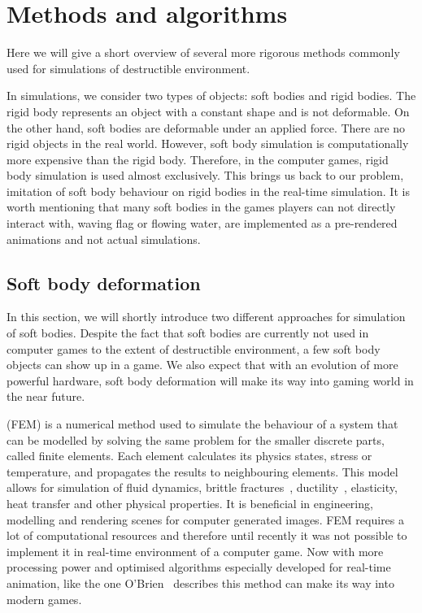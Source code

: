 \section{Methods and algorithms}

Here we will give a short overview of several more rigorous methods commonly used for simulations of destructible environment. 

In simulations, we consider two types of objects: soft bodies and rigid bodies. The rigid body represents an object with a constant shape and is not deformable. On the other hand, soft bodies are deformable under an applied force. There are no rigid objects in the real world. However, soft body simulation is computationally more expensive than the rigid body. Therefore, in the computer games, rigid body simulation is used almost exclusively. This brings us back to our problem, imitation of soft body behaviour on rigid bodies in the real-time simulation. It is worth mentioning that many soft bodies in the games players can not directly interact with, \eg waving flag or flowing water, are implemented as a pre-rendered animations and not actual simulations.

\subsection{Soft body deformation}
In this section, we will shortly introduce two different approaches for simulation of soft bodies. Despite the fact that soft bodies are currently not used in computer games to the extent of destructible environment, a few soft body objects can show up in a game. We also expect that with an evolution of more powerful hardware, soft body deformation will make its way into gaming world in the near future.
\label{sec:softBody}

 (FEM) is a numerical method used to simulate the behaviour of a system that can be modelled by solving the same problem for the smaller discrete parts, called finite elements. Each element calculates its physics states, \eg stress or temperature, and propagates the results to neighbouring elements. This model allows for simulation of fluid dynamics, brittle fractures~\cite{brittlefracture}, ductility~\cite{ductilefracture}, elasticity, heat transfer and other physical properties. It is beneficial in engineering, modelling and rendering scenes for computer generated images. FEM requires a lot of computational resources and therefore until recently it was not possible to implement it in real-time environment of a computer game. Now with more processing power and optimised algorithms especially developed for real-time animation, like the one O'Brien~\cite{femingames} describes this method can make its way into modern games.

